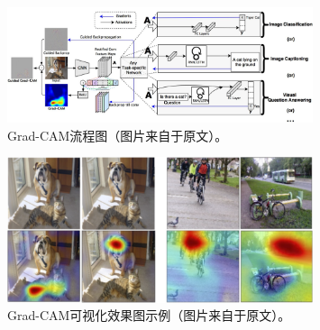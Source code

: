 \begin{figure}[h]
	\centering
	\includegraphics[width=0.8\textwidth]{figure/grad_cam_architecture}
	\caption{Grad-CAM流程图（图片来自于原文）。}
	\label{fig:grad_cam_architecture}
\end{figure}
\begin{figure}[h]
	\centering
	\includegraphics[width=0.8\textwidth]{figure/grad_cam_example}
	\caption{Grad-CAM可视化效果图示例（图片来自于原文）。} 
	\label{fig:grad_cam_example}
\end{figure}
